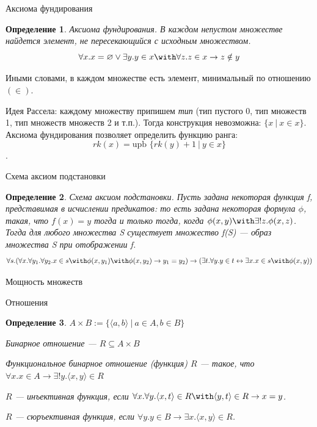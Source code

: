 \documentclass[aspectratio=169]{beamer}
\newtheorem{dfn}{Определение}[section]
\begin{document}
\begin{frame}{Аксиома фундирования}
\begin{dfn}Аксиома фундирования. 
В каждом непустом множестве найдется элемент, не пересекающийся с исходным множеством.
$$\forall x .x = \varnothing \vee \exists y .y \in x \with \forall z.z \in x \rightarrow z \notin y$$
\end{dfn}

Иными словами, в каждом множестве есть элемент, минимальный по отношению $(\in)$.

Идея Рассела: каждому множеству припишем \emph{тип} (тип пустого 0, тип множеств 1,
тип множеств множеств 2 и т.п.). Тогда конструкция невозможна: $\{ x\ |\ x \in x\}$.
Аксиома фундирования позволяет определить функцию ранга:
$$rk(x) = \text{upb }\{rk(y) + 1\ |\ y\in x\}$$.
\end{frame}

\begin{frame}{Схема аксиом подстановки}
\begin{dfn}Схема аксиом подстановки. 
Пусть задана некоторая функция f, представимая в исчислении предикатов:
то есть задана некоторая формула $\phi$, такая, что $f(x) = y$
тогда и только тогда, когда $\phi(x,y) \with \exists ! z. \phi(x,z)$.
Тогда для любого множества S существует множество f(S) --- образ
множества S при отображении f.
$$\forall s .(\forall x .\forall y_1 .\forall y_2 .x \in s \with \phi (x,y_1) \with \phi
(x,y_2) \rightarrow y_1=y_2) \rightarrow 
(\exists t .\forall y .y \in t
\leftrightarrow \exists x . x \in s \with \phi (x,y)) $$
\end{dfn}
\end{frame}

\begin{frame}{}
\LARGE\begin{center}Мощность множеств\end{center}
\end{frame}

\begin{frame}{Отношения}
\begin{dfn}$A \times B := \{\langle a,b \rangle\ |\ a \in A, b \in B\}$

Бинарное отношение --- $R \subseteq A \times B$

Функциональное бинарное отношение (функция) $R$ --- такое, что $\forall x.x\in A\rightarrow\exists !y.\langle x,y\rangle \in R$

$R$ --- инъективная функция, если $\forall x.\forall y.\langle x,t\rangle \in R\with \langle y,t\rangle \in R \rightarrow x=y$.

$R$ --- сюръективная функция, если $\forall y.y \in B\rightarrow\exists x.\langle x,y\rangle\in R$.\end{dfn}
\end{frame}
\end{document}
